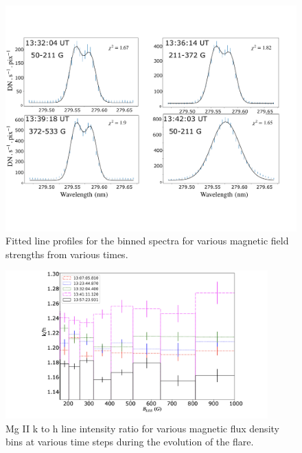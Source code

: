 \begin{figure}[ht!]
    \begin{center}
    \includegraphics[trim={0cm 3cm 0cm 3cm},clip,width=\textwidth]{Figures/binned_fit_fov.pdf}
    \end{center}
    \caption{Fitted line profiles for the binned spectra for various magnetic field strengths from various times.}
    \label{fig:fit_pix_fov}
\end{figure}

\begin{figure}[ht!]
    \centering
    \includegraphics[trim={8cm 1cm 2cm 0.2cm},clip,width=0.9\textwidth]{Figures/Flare-m-optical-depth-2.jpeg}
    \caption{Mg II k to h line intensity ratio for various magnetic flux density bins at various time steps during the evolution of the flare.}
    \label{fig:optical_depth_m}
\end{figure}

